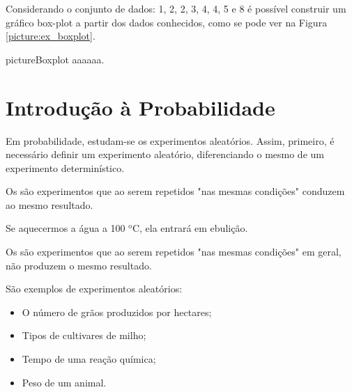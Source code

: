 \documentclass[11pt,fleqn]{book}
\numberwithin{mpicture}{chapter}
\numberwithin{mtable}{chapter}
\numberwithin{mframe}{chapter}
\begin{document}
\begin{example}
	Considerando o conjunto de dados: 1, 2, 2, 3, 4, 4, 5 e 8 é possível construir um gráfico box-plot a partir dos dados conhecidos, como se pode ver na Figura \ref{picture:ex_boxplot}.
\end{example}

\newpage

\begin{pageWidthArea}
	\begin{pageWidthAreaPicture}{picture}{Boxplot aaaaaa.}
		\label{picture:ex_boxplot}
		\centering
	\end{pageWidthAreaPicture}
\end{pageWidthArea}

\chapter{Introdução à Probabilidade}

Em probabilidade, estudam-se os experimentos aleatórios. Assim, primeiro, é necessário definir um experimento aleatório, diferenciando o mesmo de um experimento determinístico.

\begin{definition}
	Os  são experimentos que ao serem repetidos "nas mesmas condições" conduzem ao mesmo resultado.
\end{definition}

\begin{example}
	Se aquecermos a água a 100 $^{\text{o}}$C, ela entrará em ebulição.
\end{example}

\begin{definition}
	Os  são experimentos que ao serem repetidos "nas mesmas condições" em geral, não produzem o mesmo resultado.
\end{definition}

\begin{example}
	São exemplos de experimentos aleatórios:
	\begin{itemize}
		\item O número de grãos produzidos por hectares;
		\item Tipos de cultivares de milho;
		\item Tempo de uma reação química;
		\item Peso de um animal.
	\end{itemize}
\end{example}
\end{document}
